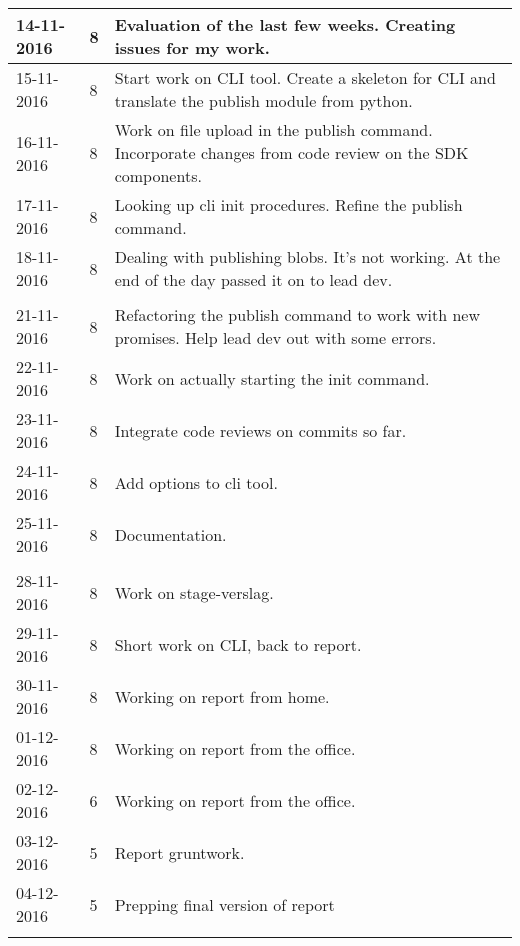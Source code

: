 \begin{tabular}{|p{2cm}|p{1cm}|p{10cm}|}
	\hline
	14-11-2016 & 8 & Evaluation of the last few weeks. Creating issues for my work. \\ \hline
	15-11-2016 & 8 & Start work on CLI tool. Create a skeleton for CLI and translate the publish module from python. \\ \hline
	16-11-2016 & 8 & Work on file upload in the publish command. Incorporate changes from code review on the SDK components. \\ \hline
	17-11-2016 & 8 & Looking up cli init procedures. Refine the publish command. \\ \hline
	18-11-2016 & 8 & Dealing with publishing blobs. It's not working. At the end of the day passed it on to lead dev. \\ \hline
	
	\\ \hline
	
	21-11-2016 & 8 & Refactoring the publish command to work with new promises. Help lead dev out with some errors. \\ \hline
	22-11-2016 & 8 & Work on actually starting the init command. \\ \hline
	23-11-2016 & 8 & Integrate code reviews on commits so far. \\ \hline
	24-11-2016 & 8 & Add options to cli tool. \\ \hline
	25-11-2016 & 8 & Documentation. \\ \hline
	
	\\ \hline
	
	28-11-2016 & 8 & Work on stage-verslag. \\ \hline
	29-11-2016 & 8 & Short work on CLI, back to report. \\ \hline
	30-11-2016 & 8 & Working on report from home. \\ \hline
	01-12-2016 & 8 & Working on report from the office. \\ \hline
	02-12-2016 & 6 & Working on report from the office. \\ \hline
	03-12-2016 & 5 & Report gruntwork. \\ \hline
	04-12-2016 & 5 & Prepping final version of report \\ \hline
	
	\\ \hline
	

\end{tabular}
